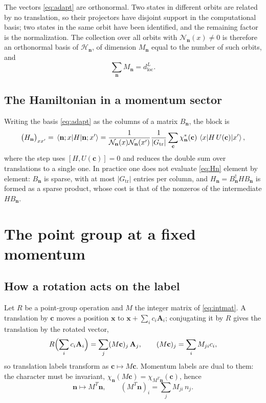\documentclass[12pt]{article}
\newcommand{\Hil}{\mathscr{H}}
\newcommand{\Gtr}{G_{\mathrm{tr}}}
\begin{document}
The vectors \eqref{eq:adapt} are orthonormal. Two states in different orbits are
related by no translation, so their projectors have disjoint support in the
computational basis; two states in the same orbit have been identified, and the
remaining factor is the normalization. The collection over all orbits with
$\mathcal{N}_{\mathbf{n}}(x)\neq 0$ is therefore an orthonormal basis of
$\Hil_{\mathbf{n}}$, of dimension $M_{\mathbf{n}}$ equal to the number of such
orbits, and
\begin{equation}
  \sum_{\mathbf{n}} M_{\mathbf{n}} = d_{\mathrm{loc}}^{L} .
\end{equation}

\subsection{The Hamiltonian in a momentum sector}

Writing the basis \eqref{eq:adapt} as the columns of a matrix $B_{\mathbf{n}}$,
the block is
\begin{equation}
  \bigl(H_{\mathbf{n}}\bigr)_{xx'} = \mel{\mathbf{n};x}{H}{\mathbf{n};x'}
  = \frac{1}{\mathcal{N}_{\mathbf{n}}(x)\mathcal{N}_{\mathbf{n}}(x')}
  \frac{1}{|\Gtr|}\sum_{\mathbf{c}}
  \chi_{\mathbf{n}}^{*}(\mathbf{c})\,\mel{x}{H\,U(\mathbf{c})}{x'},
  \label{eq:Hn}
\end{equation}
where the step uses $[H,U(\mathbf{c})] = 0$ and reduces the double sum over
translations to a single one. In practice one does not evaluate
\eqref{eq:Hn} element by element: $B_{\mathbf{n}}$ is sparse, with at most
$|\Gtr|$ entries per column, and $H_{\mathbf{n}} = B_{\mathbf{n}}^{\dagger} H
B_{\mathbf{n}}$ is formed as a sparse product, whose cost is that of the
nonzeros of the intermediate $HB_{\mathbf{n}}$.

\section{The point group at a fixed momentum}\label{sec:little}

\subsection{How a rotation acts on the label}

Let $R$ be a point-group operation and $M$ the integer matrix of
\eqref{eq:intmat}. A translation by $\mathbf{c}$ moves a position
$\mathbf{x}$ to $\mathbf{x} + \sum_i c_i\mathbf{A}_i$; conjugating it by $R$ gives
the translation by the rotated vector,
\begin{equation}
  R\Bigl(\sum_i c_i\mathbf{A}_i\Bigr) = \sum_j (M\mathbf{c})_j\,\mathbf{A}_j,
  \qquad (M\mathbf{c})_j = \sum_i M_{ji}c_i ,
  \label{eq:Mpos}
\end{equation}
so translation labels transform as $\mathbf{c}\mapsto M\mathbf{c}$. Momentum
labels are dual to them: the character must be invariant,
$\chi_{\mathbf{n}}(M\mathbf{c}) = \chi_{M^{T}\mathbf{n}}(\mathbf{c})$, hence
\begin{equation}
  \mathbf{n} \mapsto M^{T}\mathbf{n}, \qquad
  (M^{T}\mathbf{n})_i = \sum_j M_{ji}\,n_j .
  \label{eq:Mmom}
\end{equation}
\end{document}
